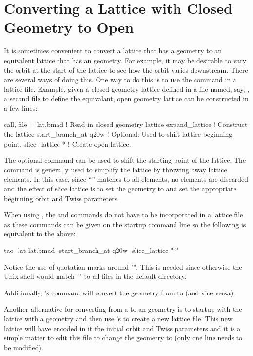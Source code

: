 \documentclass{hitec}     %
\newcommand{\Section}[1]{\section{#1}\vspace*{-1ex}}
\begin{document}
\Section{Converting a Lattice with Closed Geometry to Open}

It is sometimes convenient to convert a lattice that has a  geometry to an equivalent lattice
that has an  geometry. For example, it may be desirable to vary the orbit at the start of the
lattice to see how the orbit varies downstream. There are several ways of doing this. One way to do
this is to use the  command in a lattice file. Example, given a closed geometry
lattice defined in a file named, say, , a second file to define the equivalant, open geometry
lattice can be constructed in a few lines:
\begin{code}
call, file = lat.bmad ! Read in closed geometry lattice
expand_lattice        ! Construct the lattice
start_branch_at q20w  ! Optional: Used to shift lattice beginning point.
slice_lattice *       ! Create open lattice.
\end{code}
The optional  command can be used to shift the starting point of the lattice.
The  command is generally used to simplify the lattice by throwing away lattice
elements. In this case, since ``\vn{*}'' matches to all elements, no elements are discarded and the
effect of slice lattice is to set the geometry to  and set the appropriate beginning orbit
and Twiss parameters.

When using \tao, the  and  commands do not have to be
incorporated in a lattice file as these commands can be given on the startup command line so the
following is equivalent to the above:
\begin{code}
tao -lat lat.bmad -start_branch_at q20w -slice_lattice "*"
\end{code}
Notice the use of quotation marks around "\vn{*}". This is needed since otherwise the Unix shell would
match "\vn{*}" to all files in the default directory.

Additionally, \tao's  command will convert the geometry from  to  (and
vice versa).

Another alternative for converting from a  to an  geometry is to startup \tao
with the lattice with a  geometry and then use \tao's  to create a new
lattice file. This new lattice will have encoded in it the initial orbit and Twiss parameters and it
is a simple matter to edit this file to change the geometry to  (only one line needs to be
modified).
\end{document}
